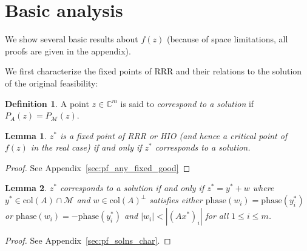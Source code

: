 \documentclass[journal]{IEEEtran}
\newtheorem{lemma}{Lemma}
\theoremstyle{definition}
\newtheorem{definition}{Definition}
\theoremstyle{remark}
\theoremstyle{definition}
\theoremstyle{problem}
\theoremstyle{definition}
\newcommand{\blem}{\begin{lemma}}
\newcommand{\elem}{\end{lemma}}
\newcommand{\bpof}{\begin{proof}}
\newcommand{\epof}{\end{proof}}
\newcommand{\bdefn}{\begin{definition}}
\newcommand{\edefn}{\end{definition}}
\newcommand{\col}{\text{col}}
\newcommand{\CC}{\mathbb{C}}
\newcommand{\MM}{\mathcal{M}}
\newcommand{\TODO}[1]{{\color{red}{[#1]}}}
\begin{document}
%
%
%

\section{Basic analysis}

We show several basic results about $f(z)$ (because of space limitations, all proofs are given in the appendix).

We first characterize the fixed points of RRR and their relations to the solution of the original feasibility:
\bdefn\label{defn:soln} A point $z\in\CC^m$ is said to \emph{correspond to a solution} if $P_A(z) = P_{\MM}(z)$. \edefn

\blem\label{lem:any_fixed_is_good} $z^*$ is a fixed point of RRR or HIO (and hence a critical point of $f(z)$ in the real case) if and only if $z^*$ corresponds to a solution. \elem
\bpof See Appendix~\ref{sec:pf_any_fixed_good} \epof

\blem\label{lem:solns_char} $z^*$ corresponds to a solution if and only if $z^* = y^* + w$ where $y^*\in\col(A)\cap \MM$ and $w\in\col(A)^{\perp}$ satisfies either $\text{phase}(w_i) = \text{phase}(y^*_i)$ or $\text{phase}(w_i) = -\text{phase}(y^*_i)$ and $|w_i|<|(Ax^*)_i|$ for all $1\leq i\leq m$. \elem
\bpof  See Appendix~\ref{sec:pf_solns_char}. \epof
\end{document}
